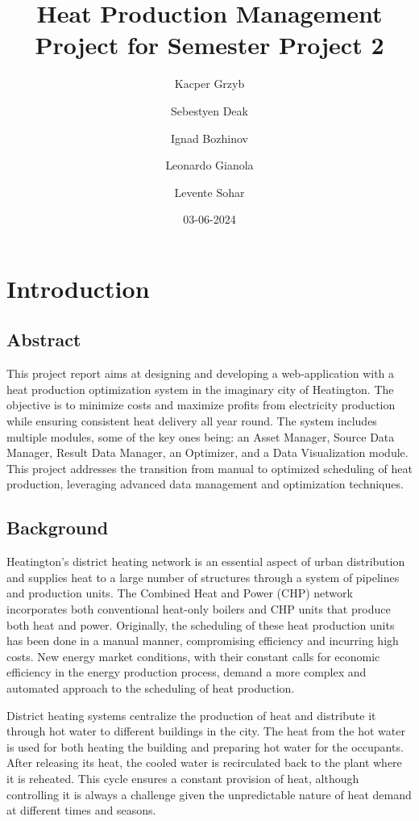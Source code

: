 \documentclass[12pt]{report}
\title{Heat Production Management Project for Semester Project 2}
\author{Kacper Grzyb \and Sebestyen Deak \and Ignad Bozhinov \and Leonardo Gianola \and Levente Sohar}
\date{03-06-2024}
\begin{document}
\maketitle

\tableofcontents

\chapter{Introduction}

\section*{Abstract}
This project report aims at designing and developing a web-application with a heat production optimization system in the imaginary city of Heatington. The objective is to minimize costs and maximize profits from electricity production while ensuring consistent heat delivery all year round. The system includes multiple modules, some of the key ones being: an Asset Manager, Source Data Manager, Result Data Manager, an Optimizer, and a Data Visualization module. This project addresses the transition from manual to optimized scheduling of heat production, leveraging advanced data management and optimization techniques.

\section{Background}
Heatington’s district heating network is an essential aspect of urban distribution and supplies heat to a large number of structures through a system of pipelines and production units. The Combined Heat and Power (CHP) network incorporates both conventional heat-only boilers and CHP units that produce both heat and power. Originally, the scheduling of these heat production units has been done in a manual manner, compromising efficiency and incurring high costs. New energy market conditions, with their constant calls for economic efficiency in the energy production process, demand a more complex and automated approach to the scheduling of heat production.

District heating systems centralize the production of heat and distribute it through hot water to different buildings in the city. The heat from the hot water is used for both heating the building and preparing hot water for the occupants. After releasing its heat, the cooled water is recirculated back to the plant where it is reheated. This cycle ensures a constant provision of heat, although controlling it is always a challenge given the unpredictable nature of heat demand at different times and seasons.
\end{document}
